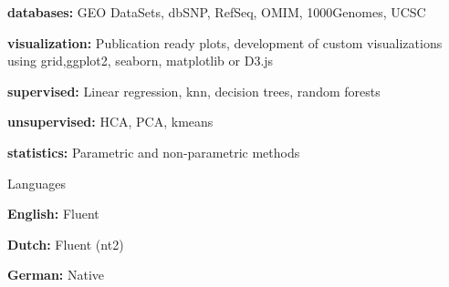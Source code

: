 \begin{cvskills}
{\begin{cvitems}
        \item {\textbf{databases:} GEO DataSets, dbSNP, RefSeq, OMIM, 1000Genomes, UCSC}
        \item {\textbf{visualization:} Publication ready plots, development of custom visualizations using grid,\newline ggplot2, seaborn, matplotlib or D3.js}
        \item {\textbf{supervised:} Linear regression, knn, decision trees, random forests}
        \item {\textbf{unsupervised:} HCA, PCA, kmeans}
        \item {\textbf{statistics:} Parametric and non-parametric methods}
      \end{cvitems}
    }
  \cvskill
    {Languages} %
    {
      \begin{cvitems}
        \item {\textbf{English:} Fluent}
        \item {\textbf{Dutch:} Fluent (nt2)}
        \item {\textbf{German:} Native}
      \end{cvitems}
    }
\end{cvskills}

